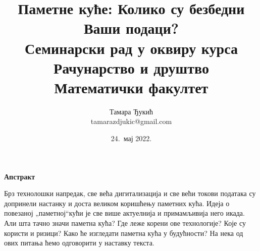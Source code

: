 \documentclass[a4paper]{article}
\begin{document}
\title{Паметне куће: Колико су безбедни Ваши подаци?\\ \small{Семинарски рад у оквиру курса\\Рачунарство и друштво\\Математички факултет}}

\author{Тамара Ђукић\\ tamarazdjukic@gmail.com}
\date{24.~мај 2022.}
\maketitle

\begin{center}
    \textbf{Апстракт}
\end{center}
\hspace{0.5cm}Брз технолошки напредак, све већа дигитализација и све већи токови података су допринели настанку и доста великом коришћењу паметних кућа. Идеја о
повезаној „паметној“\space кући је све више актуелнија и примамљивија него икада. Али шта тачно значи паметна кућа? Где леже корени ове технологије?
Које су користи и ризици? Како ће изгледати паметна кућа у будућности? На нека од ових питања ћемо одговорити у наставку текста.

\newpage

\tableofcontents

\newpage
\end{document}
